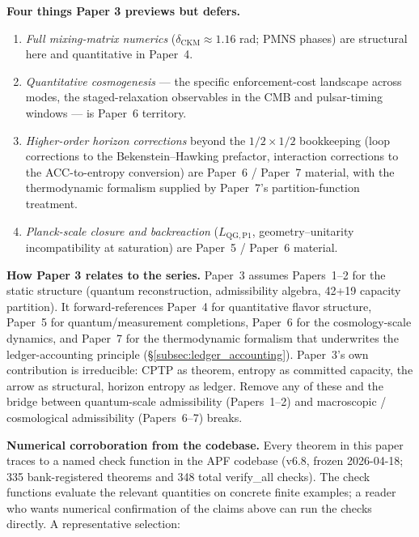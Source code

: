 \documentclass[11pt]{article}
\begin{document}
\smallskip\noindent\textbf{Four things Paper 3 previews but defers.}
\begin{enumerate}[nosep]
  \item \emph{Full mixing-matrix numerics}
    ($\delta_{\mathrm{CKM}} \approx 1.16$ rad; PMNS phases) are structural
    here and quantitative in Paper~4.
  \item \emph{Quantitative cosmogenesis} --- the specific enforcement-cost
    landscape across modes, the staged-relaxation observables in the CMB
    and pulsar-timing windows --- is Paper~6 territory.
  \item \emph{Higher-order horizon corrections} beyond the $1/2 \times 1/2$
    bookkeeping (loop corrections to the Bekenstein--Hawking prefactor,
    interaction corrections to the ACC-to-entropy conversion) are Paper~6 /
    Paper~7 material, with the thermodynamic formalism supplied by Paper~7's
    partition-function treatment.
  \item \emph{Planck-scale closure and backreaction}
    ($L_{\mathrm{QG,P1}}$, geometry--unitarity incompatibility at
    saturation) are Paper~5 / Paper~6 material.
\end{enumerate}

\smallskip\noindent\textbf{How Paper 3 relates to the series.}  Paper~3
assumes Papers~1--2 for the static structure (quantum reconstruction,
admissibility algebra, 42+19 capacity partition).  It forward-references
Paper~4 for quantitative flavor structure, Paper~5 for quantum/measurement
completions, Paper~6 for the cosmology-scale dynamics, and Paper~7 for the
thermodynamic formalism that underwrites the ledger-accounting principle
(\S\ref{subsec:ledger_accounting}).  Paper~3's own contribution is
irreducible: CPTP as theorem, entropy as committed capacity, the arrow as
structural, horizon entropy as ledger.  Remove any of these and the bridge
between quantum-scale admissibility (Papers~1--2) and macroscopic /
cosmological admissibility (Papers~6--7) breaks.

\smallskip\noindent\textbf{Numerical corroboration from the codebase.}
Every theorem in this paper traces to a named check function in the APF
codebase (v6.8, frozen 2026-04-18; 335 bank-registered theorems and 348 total verify\_all checks).  The check functions evaluate the relevant
quantities on concrete finite examples; a reader who wants numerical
confirmation of the claims above can run the checks directly.  A
representative selection:
\end{document}

